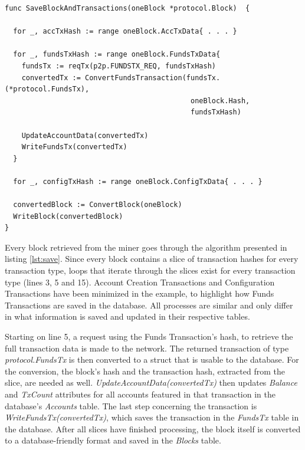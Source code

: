 \begin{lstlisting}[caption={Saving a Block and Its Transactions to the Database},captionpos=b,label={lst:save}]
func SaveBlockAndTransactions(oneBlock *protocol.Block)  {

  for _, accTxHash := range oneBlock.AccTxData{ . . . }

  for _, fundsTxHash := range oneBlock.FundsTxData{
    fundsTx := reqTx(p2p.FUNDSTX_REQ, fundsTxHash)
    convertedTx := ConvertFundsTransaction(fundsTx.(*protocol.FundsTx), 
    										oneBlock.Hash, 
											fundsTxHash)

    UpdateAccountData(convertedTx)
    WriteFundsTx(convertedTx)
  }

  for _, configTxHash := range oneBlock.ConfigTxData{ . . . }

  convertedBlock := ConvertBlock(oneBlock)
  WriteBlock(convertedBlock)
}
\end{lstlisting}

Every block retrieved from the miner goes through the algorithm presented in listing \ref{lst:save}. Since every block contains a slice of transaction hashes for every transaction type, loops that iterate through the slices exist for every transaction type (lines 3, 5 and 15). Account Creation Transactions and Configuration Transactions have been minimized in the example, to highlight how Funds Transactions are saved in the database. All processes are similar and only differ in what information is saved and updated in their respective tables.

Starting on line 5, a request using the Funds Transaction's hash, to retrieve the full transaction data is made to the network. The returned transaction of type \emph{protocol.FundsTx} is then converted to a struct that is usable to the database. For the conversion, the block's hash and the transaction hash, extracted from the slice, are needed as well. \emph{UpdateAccountData(convertedTx)} then updates \emph{Balance} and \emph{TxCount} attributes for all accounts featured in that transaction in the database's \emph{Accounts} table. The last step concerning the transaction is \emph{WriteFundsTx(convertedTx)}, which saves the transaction in the \emph{FundsTx} table in the database. After all slices have finished processing, the block itself is converted to a database-friendly format and saved in the \emph{Blocks} table.

